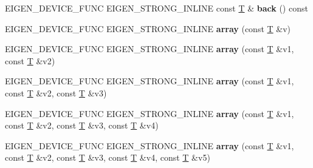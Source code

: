 \begin{DoxyCompactItemize}
\mbox{\label{class_eigen_1_1array_a7abe26988254e5c892288003ae1c17ae}} 
E\+I\+G\+E\+N\+\_\+\+D\+E\+V\+I\+C\+E\+\_\+\+F\+U\+NC E\+I\+G\+E\+N\+\_\+\+S\+T\+R\+O\+N\+G\+\_\+\+I\+N\+L\+I\+NE const \hyperlink{group___sparse_core___module}{T} \& {\bfseries back} () const
\item 
\mbox{\label{class_eigen_1_1array_a281f70fe2eb91c409832b973aa74e5fc}} 
E\+I\+G\+E\+N\+\_\+\+D\+E\+V\+I\+C\+E\+\_\+\+F\+U\+NC E\+I\+G\+E\+N\+\_\+\+S\+T\+R\+O\+N\+G\+\_\+\+I\+N\+L\+I\+NE {\bfseries array} (const \hyperlink{group___sparse_core___module}{T} \&v)
\item 
\mbox{\label{class_eigen_1_1array_a5aa7daaa1106cfb174a81b16eb13e816}} 
E\+I\+G\+E\+N\+\_\+\+D\+E\+V\+I\+C\+E\+\_\+\+F\+U\+NC E\+I\+G\+E\+N\+\_\+\+S\+T\+R\+O\+N\+G\+\_\+\+I\+N\+L\+I\+NE {\bfseries array} (const \hyperlink{group___sparse_core___module}{T} \&v1, const \hyperlink{group___sparse_core___module}{T} \&v2)
\item 
\mbox{\label{class_eigen_1_1array_a18f9de84e4fd405b9207670b5d48bbcc}} 
E\+I\+G\+E\+N\+\_\+\+D\+E\+V\+I\+C\+E\+\_\+\+F\+U\+NC E\+I\+G\+E\+N\+\_\+\+S\+T\+R\+O\+N\+G\+\_\+\+I\+N\+L\+I\+NE {\bfseries array} (const \hyperlink{group___sparse_core___module}{T} \&v1, const \hyperlink{group___sparse_core___module}{T} \&v2, const \hyperlink{group___sparse_core___module}{T} \&v3)
\item 
\mbox{\label{class_eigen_1_1array_aca9e2d974e99dc0fb6441d90aaf22ba4}} 
E\+I\+G\+E\+N\+\_\+\+D\+E\+V\+I\+C\+E\+\_\+\+F\+U\+NC E\+I\+G\+E\+N\+\_\+\+S\+T\+R\+O\+N\+G\+\_\+\+I\+N\+L\+I\+NE {\bfseries array} (const \hyperlink{group___sparse_core___module}{T} \&v1, const \hyperlink{group___sparse_core___module}{T} \&v2, const \hyperlink{group___sparse_core___module}{T} \&v3, const \hyperlink{group___sparse_core___module}{T} \&v4)
\item 
\mbox{\label{class_eigen_1_1array_a3506835f181e0fdd76fe082cbc4b9d3f}} 
E\+I\+G\+E\+N\+\_\+\+D\+E\+V\+I\+C\+E\+\_\+\+F\+U\+NC E\+I\+G\+E\+N\+\_\+\+S\+T\+R\+O\+N\+G\+\_\+\+I\+N\+L\+I\+NE {\bfseries array} (const \hyperlink{group___sparse_core___module}{T} \&v1, const \hyperlink{group___sparse_core___module}{T} \&v2, const \hyperlink{group___sparse_core___module}{T} \&v3, const \hyperlink{group___sparse_core___module}{T} \&v4, const \hyperlink{group___sparse_core___module}{T} \&v5)

\end{DoxyCompactItemize}
